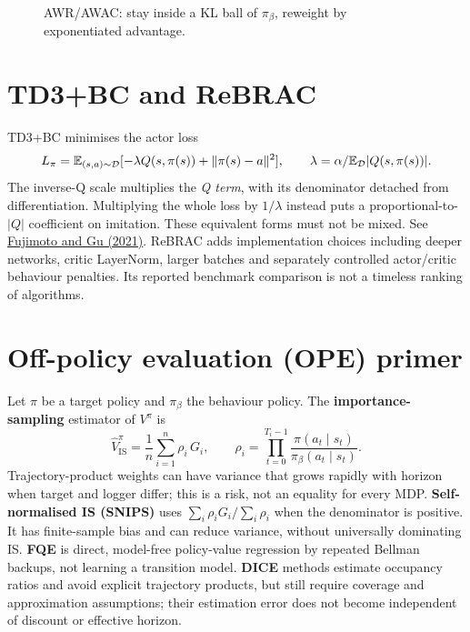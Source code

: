 \documentclass[11pt,oneside]{scrbook}
\begin{document}
\begin{figure}[h]
\centering
{}
\caption{AWR/AWAC: stay inside a KL ball of $\pi_\beta$, reweight by exponentiated advantage.}
\end{figure}

\section{TD3+BC and ReBRAC}

TD3+BC minimises the actor loss
\[
 L_\pi=\mathbb{E}_{(s,a)\sim\mathcal D}[-\lambda Q(s,\pi(s))+\|\pi(s)-a\|^2],
 \qquad \lambda=\alpha/\mathbb{E}_{\mathcal D}|Q(s,\pi(s))|.
\]
The inverse-Q scale multiplies the \emph{Q term}, with its denominator detached
from differentiation. Multiplying the whole loss by $1/\lambda$ instead
puts a proportional-to-$|Q|$ coefficient on imitation. These equivalent
forms must not be mixed. See \href{https://arxiv.org/abs/2106.06860}{Fujimoto and Gu (2021)}.
ReBRAC adds implementation choices including deeper networks, critic LayerNorm,
larger batches and separately controlled actor/critic behaviour penalties.
Its reported benchmark comparison is not a timeless ranking of algorithms.

\section{Off-policy evaluation (OPE) primer}

Let $\pi$ be a target policy and $\pi_\beta$ the behaviour policy. The
\textbf{importance-sampling} estimator of $V^\pi$ is
\[
  \hat V^\pi_{\mathrm{IS}} = \frac{1}{n} \sum_{i=1}^n \rho_i \, G_i,
  \qquad \rho_i = \prod_{t=0}^{T_i-1} \frac{\pi(a_t \mid s_t)}{\pi_\beta(a_t \mid s_t)}.
\]
Trajectory-product weights can have variance that grows rapidly with horizon
when target and logger differ; this is a risk, not an equality for every MDP.
\textbf{Self-normalised IS (SNIPS)} uses
$\sum_i\rho_iG_i/\sum_i\rho_i$ when the denominator is positive. It has
finite-sample bias and can reduce variance, without universally dominating IS.
\textbf{FQE} is direct, model-free policy-value regression by repeated Bellman
backups, not learning a transition model. \textbf{DICE} methods estimate
occupancy ratios and avoid explicit trajectory products, but still require
coverage and approximation assumptions; their estimation error does not
become independent of discount or effective horizon.
\end{document}
